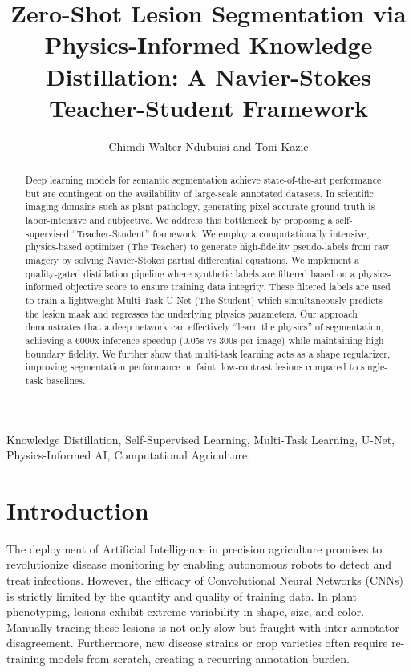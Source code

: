 \documentclass[journal]{IEEEtran}
\begin{document}
\title{Zero-Shot Lesion Segmentation via Physics-Informed Knowledge Distillation: A Navier-Stokes Teacher-Student Framework}

\author{Chimdi Walter Ndubuisi and Toni Kazic}

\maketitle

\begin{abstract}
Deep learning models for semantic segmentation achieve state-of-the-art performance but are contingent on the availability of large-scale annotated datasets. In scientific imaging domains such as plant pathology, generating pixel-accurate ground truth is labor-intensive and subjective. We address this bottleneck by proposing a self-supervised ``Teacher-Student'' framework. We employ a computationally intensive, physics-based optimizer (The Teacher) to generate high-fidelity pseudo-labels from raw imagery by solving Navier-Stokes partial differential equations. We implement a quality-gated distillation pipeline where synthetic labels are filtered based on a physics-informed objective score to ensure training data integrity. These filtered labels are used to train a lightweight Multi-Task U-Net (The Student) which simultaneously predicts the lesion mask and regresses the underlying physics parameters. Our approach demonstrates that a deep network can effectively ``learn the physics'' of segmentation, achieving a 6000x inference speedup (0.05s vs 300s per image) while maintaining high boundary fidelity. We further show that multi-task learning acts as a shape regularizer, improving segmentation performance on faint, low-contrast lesions compared to single-task baselines.
\end{abstract}

\begin{IEEEkeywords}
Knowledge Distillation, Self-Supervised Learning, Multi-Task Learning, U-Net, Physics-Informed AI, Computational Agriculture.
\end{IEEEkeywords}

\section{Introduction}
The deployment of Artificial Intelligence in precision agriculture promises to revolutionize disease monitoring by enabling autonomous robots to detect and treat infections. However, the efficacy of Convolutional Neural Networks (CNNs) is strictly limited by the quantity and quality of training data. In plant phenotyping, lesions exhibit extreme variability in shape, size, and color. Manually tracing these lesions is not only slow but fraught with inter-annotator disagreement. Furthermore, new disease strains or crop varieties often require re-training models from scratch, creating a recurring annotation burden.
\end{document}
